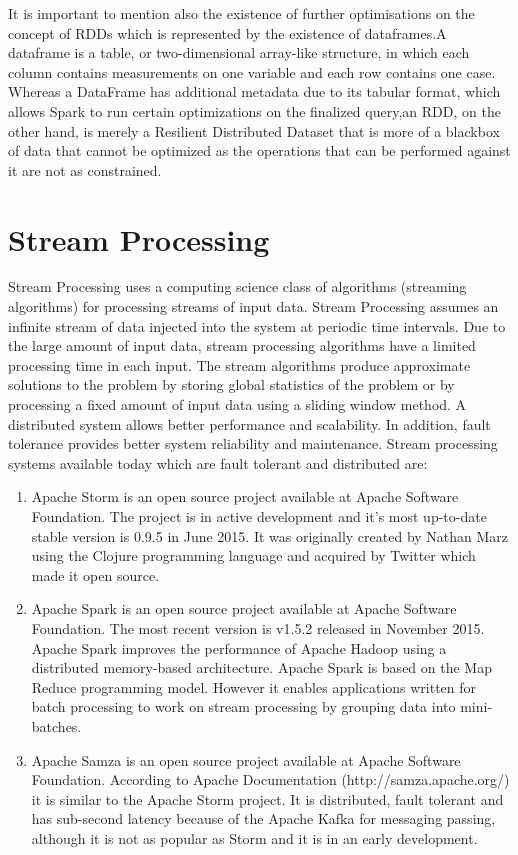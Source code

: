 \documentclass{lmproj}
\begin{document}
It is important to mention also the existence of further optimisations on the concept of RDDs which is represented by the existence of dataframes.A dataframe is a table, or two-dimensional array-like structure, in which each column contains measurements on one variable and each row contains one case.
Whereas a DataFrame has additional metadata due to its tabular format, which allows Spark to run certain optimizations on the finalized query,an RDD, on the other hand, is merely a Resilient Distributed Dataset that is more of a blackbox of data that cannot be optimized as the operations that can be performed against it are not as constrained.


\section{Stream Processing}
\label{relatedwork}

Stream Processing uses a computing science class of algorithms (streaming algorithms) for processing streams of input data. Stream Processing assumes an infinite stream of data injected into the system at periodic time intervals. Due to the large amount of input data, stream processing algorithms have a limited processing time in each input.  The stream algorithms produce approximate solutions to the problem by storing global statistics of the problem or by processing a fixed amount of input data using a sliding window method.
A distributed system allows better performance and scalability. In addition, fault tolerance provides better system reliability and maintenance. Stream processing systems available today which are fault tolerant and distributed are:

\begin{enumerate}
	\item Apache Storm is an open source project available at Apache Software Foundation. The project is in active development and it’s most up-to-date stable version is 0.9.5 in June 2015. It was originally created by Nathan Marz using the Clojure programming language and acquired by Twitter which made it open source. 
	\item Apache Spark is an open source project available at Apache Software Foundation. The most recent version is v1.5.2 released in November 2015. Apache Spark improves the performance of Apache Hadoop using a distributed memory-based architecture. Apache Spark is based on the Map Reduce programming model. However it enables applications written for batch processing to work on stream processing by grouping data into mini-batches.
	\item Apache Samza is an open source project available at Apache Software Foundation. According to Apache Documentation (http://samza.apache.org/) it is similar to the Apache Storm project. It is distributed, fault tolerant and has sub-second latency because of the Apache Kafka for messaging passing, although it is not as popular as Storm and it is in an early development.
\end{enumerate}
\end{document}
